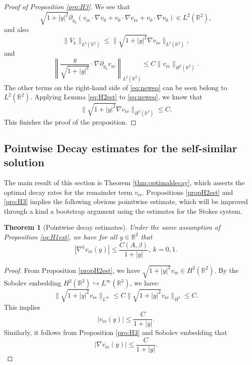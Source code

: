 \documentclass[12pt]{amsart}
\numberwithin{equation}{section}              %
\newtheorem{theorem}{Theorem}[section]
\theoremstyle{remark}
\begin{document}
\begin{proof}[Proof of Proposition \ref{pro:H3}]
			
			We see that
			\begin{equation*}
				\sqrt{1+|y|^2} \partial_{y_k} (v_{\text{re}} \cdot \nabla v_0 + v_0 \cdot \nabla v_{\text{re}} + v_0 \cdot \nabla v_0) \in L^2(\mathbb{R}^2),
			\end{equation*}
			and also 
			\begin{equation*}
				\|V_k\|_{L^2(\mathbb{R}^2)} \leq \|\sqrt{1+|y|^2} \nabla v_{\text{re}}\|_{L^2(\mathbb{R}^2)},
			\end{equation*}			
			and		
			\begin{equation*}
				\left\| \frac{y}{\sqrt{1+|y|^2}} \cdot \nabla \partial_{y_k} v_{\text{re}} \right\|_{L^2(\mathbb{R}^2)} \leq C \|v_{\text{re}}\|_{H^2(\mathbb{R}^2)}.
			\end{equation*}
            The other terms on the right-hand side of \eqref{eq:neweq} can  be seen belong to $L^2(\mathbb{R}^2)$.
			Applying Lemma \ref{eq:H2est} to \eqref{eq:neweq}, we know that
			\begin{equation*}
				\|\sqrt{1+|y|^2}\nabla v_{\textrm{re}}\|_{H^2(\mathbb{R}^2)} \le C.
			\end{equation*}
			This finishes the proof of the proposition.
		\end{proof}
		
		
		\subsection{Pointwise Decay estimates for the self-similar solution}
		The main result of this section is Theorem \ref{thm:optimaldecay}, which asserts the optimal decay rates for the remainder term $v_{\textrm{re}}$. 
		Propositions \ref{propH2est} and \ref{pro:H3} implies the following obvious poinitwise estimate, which will be improved through a kind a bootstrap argument using the estimates for the Stokes system.
		\begin{theorem}[Pointwise decay estimates]\label{thm:pointdecay}
			Under the same assumption of Proposition \ref{eq:H1est}, we have 
			for all $y \in \mathbb{R}^2$ that
			\begin{equation*}
				|\nabla^k v_{\text{re}}(y)| \le\frac{C(A,\beta)}{1+|y|}, ~k =0,1.
			\end{equation*}
		\end{theorem}
		
		\begin{proof}
			From Proposition \ref{propH2est}, we have $\sqrt{1+|y|^2}v_{\text{re}} \in H^2(\mathbb{R}^2)$. By the Sobolev embedding $H^2(\mathbb{R}^2) \hookrightarrow L^\infty(\mathbb{R}^2)$, we have:
			\[
			\| \sqrt{1+|y|^2} v_{\text{re}} \|_{L^\infty} \le C \| \sqrt{1+|y|^2} v_{\text{re}} \|_{H^2} \le C.
			\]
			This implies 
			\begin{equation*}
				|v_{\text{re}}(y)| \le \frac{C}{1+|y|}.
			\end{equation*}
			Similarly, it follows from Proposition \ref{pro:H3} and Sobolev embedding that
			\begin{equation*}
				|\nabla v_{\text{re}}(y)| \le \frac{C}{1+|y|}.
			\end{equation*}
		\end{proof}
		
\end{document}
